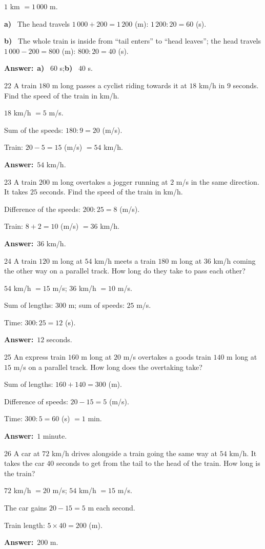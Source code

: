 \documentclass[11pt]{article}
\newif\ifsol \solfalse
\providecommand{\AnsWord}{Đáp số}
\newcommand{\dapso}[1]{\par\textbf{\AnsWord:}\ #1}
\newcommand{\probsol}[1]{%
  \begin{lrbox}{\solmeasure}\begin{minipage}{\dimexpr\linewidth-24pt\relax}#1\end{minipage}\end{lrbox}%
  \ifsol
    \begin{solbox}#1\end{solbox}%
  \else
    \setlength{\solht}{\dimexpr\ht\solmeasure+\dp\solmeasure+0.85cm\relax}%
    \ifdim\solht<1.35cm\setlength{\solht}{1.35cm}\fi
    \begin{tcolorbox}[colback=white,colframe=Line,boxrule=0.8pt,arc=5pt,
      left=8pt,right=8pt,top=4pt,bottom=4pt,height=\solht]{\footnotesize\color{Slate}\itshape\WorkWord}\end{tcolorbox}%
  \fi}
\newcommand{\pa}[1]{\textbf{#1)}\ }
\newcommand{\gap}{\vspace{0.3cm}}
\def\WorkWord{Your work:}
\def\AnsWord{Answer}
\begin{document}
\probsol{
$1$ km $=1\,000$ m.\par
\pa{a} The head travels $1\,000+200=1\,200$ (m): $1\,200:20=60$ (s).\par
\pa{b} The whole train is inside from ``tail enters'' to ``head leaves''; the head travels $1\,000-200=800$ (m): $800:20=40$ (s).
\dapso{\pa{a} $60$ s;\quad \pa{b} $40$ s.}}
\gap
\begin{probbox}{22}{\relax}
A train $180$ m long passes a cyclist riding towards it at $18$ km/h in $9$ seconds. Find the speed of the train in km/h.
\end{probbox}
\probsol{
$18$ km/h $=5$ m/s.\par Sum of the speeds: $180:9=20$ (m/s).\par
Train: $20-5=15$ (m/s) $=54$ km/h.
\dapso{$54$ km/h.}}
\gap
\begin{probbox}{23}{\relax}
A train $200$ m long overtakes a jogger running at $2$ m/s in the same direction. It takes $25$ seconds. Find the speed of the train in km/h.
\end{probbox}
\probsol{
Difference of the speeds: $200:25=8$ (m/s).\par Train: $8+2=10$ (m/s) $=36$ km/h.
\dapso{$36$ km/h.}}
\gap
\begin{probbox}{24}{\relax}
A train $120$ m long at $54$ km/h meets a train $180$ m long at $36$ km/h coming the other way on a parallel track. How long do they take to pass each other?
\end{probbox}
\probsol{
$54$ km/h $=15$ m/s; $36$ km/h $=10$ m/s.\par Sum of lengths: $300$ m; sum of speeds: $25$ m/s.\par Time: $300:25=12$ (s).
\dapso{$12$ seconds.}}
\gap
\begin{probbox}{25}{\relax}
An express train $160$ m long at $20$ m/s overtakes a goods train $140$ m long at $15$ m/s on a parallel track. How long does the overtaking take?
\end{probbox}
\probsol{
Sum of lengths: $160+140=300$ (m).\par Difference of speeds: $20-15=5$ (m/s).\par Time: $300:5=60$ (s) $=1$ min.
\dapso{$1$ minute.}}
\gap
\begin{probbox}{26}{\relax}
A car at $72$ km/h drives alongside a train going the same way at $54$ km/h. It takes the car $40$ seconds to get from the tail to the head of the train. How long is the train?
\end{probbox}
\probsol{
$72$ km/h $=20$ m/s; $54$ km/h $=15$ m/s.\par The car gains $20-15=5$ m each second.\par Train length: $5\times40=200$ (m).
\dapso{$200$ m.}}
\end{document}
